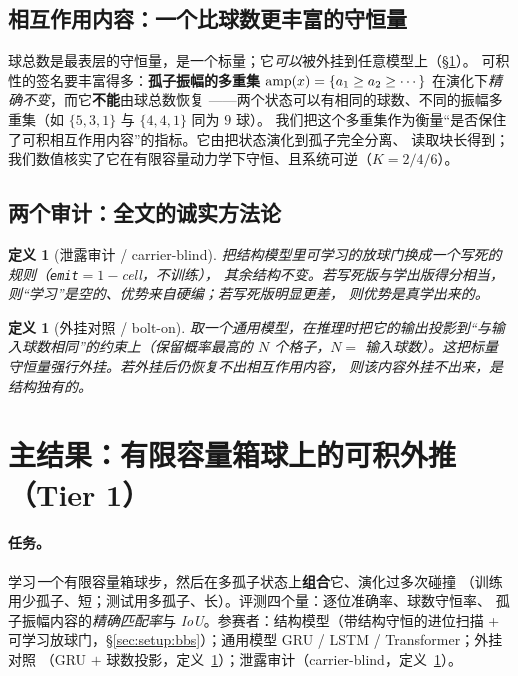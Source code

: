 \documentclass[11pt]{article}
\newtheorem{Definition}[Theorem]{定义}
\begin{document}
\subsection{相互作用内容：一个比球数更丰富的守恒量}\label{sec:setup:content}
球总数是最表层的守恒量，是一个标量；它\emph{可以}被外挂到任意模型上（\S\ref{sec:main}）。
可积性的签名要丰富得多：\textbf{孤子振幅的多重集}
$\mathrm{amp}(x)=\{a_1\ge a_2\ge\cdots\}$ 在演化下\emph{精确不变}，而它\textbf{不能}由球总数恢复
——两个状态可以有相同的球数、不同的振幅多重集（如 $\{5,3,1\}$ 与 $\{4,4,1\}$ 同为 $9$ 球）。
我们把这个多重集作为衡量“是否保住了可积相互作用内容”的指标。它由把状态演化到孤子完全分离、
读取块长得到；我们数值核实了它在有限容量动力学下守恒、且系统可逆（$K=2/4/6$）。

\subsection{两个审计：全文的诚实方法论}\label{sec:setup:audits}
\begin{Definition}[泄露审计 / carrier-blind]\label{def:leak}
把结构模型里\emph{可学习}的放球门换成一个\emph{写死}的规则（\texttt{emit}$=1-$cell，不训练），
其余结构不变。若写死版与学出版得分相当，则“学习”是空的、优势来自硬编；若写死版明显更差，
则优势是\emph{真学出来的}。
\end{Definition}

\begin{Definition}[外挂对照 / bolt-on]\label{def:bolton}
取一个通用模型，在推理时把它的输出\emph{投影}到“与输入球数相同”的约束上（保留概率最高的
$N$ 个格子，$N=$ 输入球数）。这把标量守恒量\emph{强行外挂}。若外挂后仍恢复不出相互作用内容，
则该内容\emph{外挂不出来}，是结构独有的。
\end{Definition}

\section{主结果：有限容量箱球上的可积外推（Tier 1）}\label{sec:main}

\paragraph{任务。}
学习\emph{一}个有限容量箱球步，然后在多孤子状态上\textbf{组合}它、演化过多次碰撞
（训练用少孤子、短；测试用多孤子、长）。评测四个量：逐位准确率、球数守恒率、
孤子振幅内容的\emph{精确匹配率}与 \emph{IoU}。参赛者：结构模型（带结构守恒的进位扫描 +
可学习放球门，\S\ref{sec:setup:bbs}）；通用模型 GRU / LSTM / Transformer；外挂对照
（GRU $+$ 球数投影，定义~\ref{def:bolton}）；泄露审计（carrier-blind，定义~\ref{def:leak}）。
\end{document}
